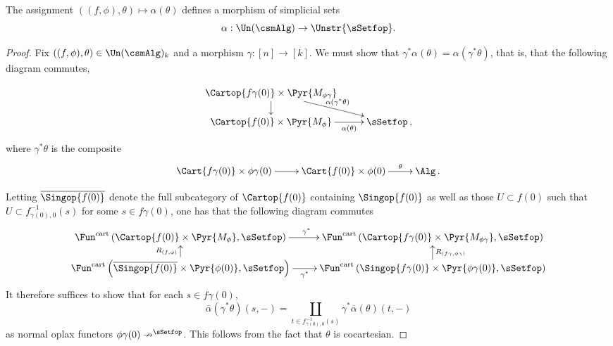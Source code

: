 \documentclass[a4paper]{article}
\numberwithin{equation}{section}
\begin{document}
\begin{lem}
 The assignment $((f,\phi),\theta) \mapsto \alpha(\theta)$ defines a morphism of simplicial sets 
 \begin{equation*}
  \alpha:\Un(\csmAlg) \to \Unstr{\sSetfop}.
 \end{equation*}
\end{lem}
\begin{proof}
 Fix $((f,\phi),\theta) \in \Un(\csmAlg)_k$ and a morphism $\gamma: [n] \to [k]$. We must show that $\gamma^* \alpha(\theta) = \alpha(\gamma^* \theta)$, that is, that the following diagram commutes, 

 \begin{equation*}
  \xymatrixrowsep{1.1pc}\xymatrixcolsep{2pc}\xymatrix{ \Cartop{f\gamma(0)}\times\Pyr{M_{\phi\gamma}} \ar[rd]^-{\alpha(\gamma^* \theta)} \ar[d] & \\
  \Cartop{f(0)} \times \Pyr{M_\phi} \ar[r]_-{\alpha(\theta)} & \sSetfop \, ,}
 \end{equation*}
where $\gamma^* \theta$ is the composite
\begin{equation*}
 \xymatrixcolsep{2pc}\xymatrix{\Cart{f\gamma(0)}\times \phi \gamma(0) \ar[r] & \Cart{f(0)}\times\phi(0) \ar[r]^-\theta & \Alg \, .}
\end{equation*}

Letting $\overline{\Singop{f(0)}}$ denote the full subcategory of $\Cartop{f(0)}$ containing $\Singop{f(0)}$ as well as those $U \subset f(0)$ such that $U \subset f_{\gamma(0),0}^{-1}(s)$ for some $s \in f\gamma(0)$, one has that the following diagram commutes
\begin{equation*}
 \xymatrixrowsep{.9pc} \xymatrix{\Fun^{\rm cart}\left(\Cartop{f(0)}\times\Pyr{M_\phi},\sSetfop\right) \ar[r]^{\gamma^*} & \Fun^{\rm cart}\left(\Cartop{f\gamma(0)}\times\Pyr{M_{\phi\gamma}},\sSetfop\right) \\
 \Fun^{\rm cart}\left( \overline{\Singop{f(0)}}\times \Pyr{\phi(0)}, \sSetfop\right) \ar[u]^-{R_{(f,\phi)}} \ar[r]_-{\gamma^*} &  \Fun^{\rm cart} \left(\Singop{f\gamma(0)}\times \Pyr{\phi\gamma(0)}, \sSetfop\right) \ar[u]_-{R_{(f\gamma, \phi\gamma)}} }
\end{equation*}
 It therefore suffices to show that for each $s \in f\gamma(0)$,
\begin{equation*}
 \overline{\alpha}(\gamma^*\theta)(s,-)= \coprod_{t \in f_{\gamma(0),0}^{-1}(s)} \gamma^*\overline{\alpha}(\theta)(t,-)
\end{equation*}
as normal oplax functors $\phi \gamma (0) \nrightarrow \sp{\sSetfop}$. This follows from the fact that $\theta$ is cocartesian.
\end{proof}
\end{document}
